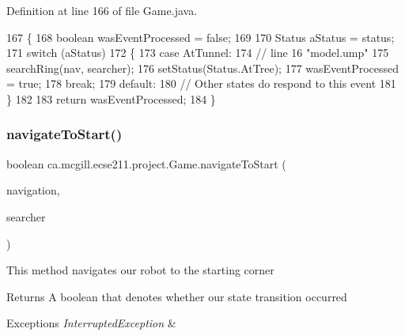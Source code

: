 Definition at line 166 of file Game.\+java.


\begin{DoxyCode}
167   \{
168     \textcolor{keywordtype}{boolean} wasEventProcessed = \textcolor{keyword}{false};
169     
170     Status aStatus = status;
171     \textcolor{keywordflow}{switch} (aStatus)
172     \{
173       \textcolor{keywordflow}{case} AtTunnel:
174         \textcolor{comment}{// line 16 "model.ump"}
175         searchRing(nav, searcher);
176         setStatus(Status.AtTree);
177         wasEventProcessed = \textcolor{keyword}{true};
178         \textcolor{keywordflow}{break};
179       \textcolor{keywordflow}{default}:
180         \textcolor{comment}{// Other states do respond to this event}
181     \}
182 
183     \textcolor{keywordflow}{return} wasEventProcessed;
184   \}
\end{DoxyCode}
\mbox{\label{enumca_1_1mcgill_1_1ecse211_1_1project_1_1_game_aa9d873f6cd4ef177c1622c24f72b0e0a}} 
\subsubsection{\texorpdfstring{navigate\+To\+Start()}{navigateToStart()}}
{\footnotesize\ttfamily boolean ca.\+mcgill.\+ecse211.\+project.\+Game.\+navigate\+To\+Start (\begin{DoxyParamCaption}\item[{\hyperlink{classca_1_1mcgill_1_1ecse211_1_1project_1_1_navigation}{Navigation}}]{navigation,  }\item[{\hyperlink{classca_1_1mcgill_1_1ecse211_1_1threads_1_1_ring_searcher}{Ring\+Searcher}}]{searcher }\end{DoxyParamCaption})}

This method navigates our robot to the starting corner

\begin{DoxyReturn}{Returns}
A boolean that denotes whether our state transition occurred 
\end{DoxyReturn}

\begin{DoxyExceptions}{Exceptions}
{\em Interrupted\+Exception} & \\
\hline
\end{DoxyExceptions}


